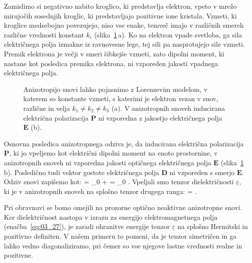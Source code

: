 Zamislimo si negativno nabito kroglico, ki predstavlja elektron, vpeto v 
mrežo mirujočih so\-sed\-njih kroglic, ki predstavljajo pozitivne ione kristala. 
Vzmeti, ki kroglice medsebojno povezujejo, niso vse enake, temveč imajo 
v različnih smereh različne vrednosti konstant $k_i$ (slika~\ref{fig:10_model}\,a). Ko na elektron
vpade svetloba, ga sila električnega polja izmakne iz ravnovesne lege, tej sili 
pa nasprotujejo sile vzmeti. Premik elektrona je večji v smeri šibkejše vzmeti, 
zato dipolni moment, ki nastane kot posledica premika elektrona, ni vzporeden jakosti 
vpadnega električnega
polja. 
\begin{figure}[!h]
\centering
\def\svgwidth{120truemm} 

\caption{Anizotropijo snovi lahko pojasnimo z Lorenzevim modelom, v katerem so
konstante vzmeti, s katerimi je elektron vezan v snov, različne  in velja $k_1 \neq k_2 \neq k_3$ (a).
V anizotropnih snoveh inducirana električna polarizacija $\mathbf{P}$ ni vzporedna 
z jakostjo električnega polja $\mathbf{E}$ (b).}
\label{fig:10_model}
\end{figure}

Osnovna posledica anizotropnega odziva je, da inducirana električna polarizacija $\mathbf{P}$, 
ki jo vpeljemo kot električni dipolni moment na enoto prostornine, 
 v anizotropnih snoveh ni vzporedna jakosti optičnega električnega polja $\mathbf{E}$ 
(slika~\ref{fig:10_model}\,b). Posledično tudi 
vektor gostote električnega polja $\mathbf{D}$ ni vzporeden s smerjo $\mathbf{E}$. 
Odziv snovi zapišemo kot:
\beq
{} = \varepsilon_0  +  = \varepsilon_0 \underline{\varepsilon} .
\label{eq:10_001}
\eeq
Vpeljali smo tenzor dielektričnosti $\underline{\varepsilon}$, ki je v anizotropnih snoveh na splošno 
tenzor drugega ranga:
\beq
\underline{\varepsilon} = 
\!\!.
\label{eq:10_002}
\eeq
\begin{remark}
Pri obravnavi se bomo omejili na prozorne optično neaktivne anizotropne snovi. 
Ker dielektričnost nastopa v izrazu za energijo elektromagnetnega polja 
(enačba~\ref{eq:03_27}), je zaradi ohranitve energije tenzor $\underline{\varepsilon}$ na splošno
Hermitski in pozitivno definiten. V našem primeru to pomeni, da je 
tenzor simetričen in ga lahko vedno diagonaliziramo, pri čemer so 
vse njegove lastne vrednosti realne in pozitivne.
\end{remark}

